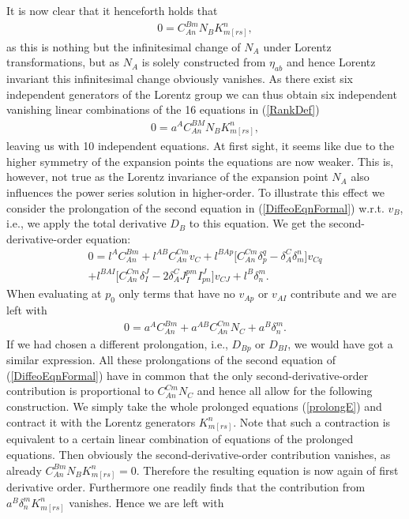 It is now clear that it henceforth holds that
\begin{align}
    0 = C^{Bm}_{An}N_B K_{m[rs]}^n,
\end{align}
as this is nothing but the infinitesimal change of $N_A$ under Lorentz transformations, but as $N_A$ is solely constructed from $\eta_{ab}$ and hence Lorentz invariant this infinitesimal change obviously vanishes. As there exist six independent generators of the Lorentz group we can thus obtain six independent vanishing linear combinations of the 16 equations in (\ref{RankDef})
\begin{align}
    0 = a^A C^{BM}_{An}N_B K_{m[rs]}^n,
\end{align}
leaving us with 10 independent equations. At first sight, it seems like due to the higher symmetry of the expansion points the equations are now weaker. This is, however, not true as the Lorentz invariance of the expansion point $N_A$ also influences the power series solution in higher-order. To illustrate this effect we consider the prolongation of the second equation in (\ref{DiffeoEqnFormal}) w.r.t. $v_B$, i.e., we apply the total derivative $D_B$ to this equation. We get the second-derivative-order equation:
\begin{multline}
    0 = l^AC_{An}^{Bm} + l^{AB}C_{An}^{Cm}v_C + l^{BAp} \bigl[ C_{An}^{Cm} \delta_p^q - \delta_A^C \delta_m^n \bigr] v_{Cq}\\
    + l^{BAI} \bigl[ C_{An}^{Cm} \delta_I^J - 2 \delta_A^C J_I^{pm} I^J_{pn}  \bigr] v_{CJ} + l^{B} \delta^m_n.
\end{multline}
When evaluating at $p_0$ only terms that have no $v_{Ap}$ or $v_{AI}$ contribute and we are left with 
\begin{align}\label{prolongE}
    0 = a^A C_{An}^{Bm} + a^{AB} C_{An}^{Cm} N_C +  a^B \delta^m_n.
\end{align}
If we had chosen a different prolongation, i.e., $D_{Bp}$ or $D_{BI}$, we would have got a similar expression. All these prolongations of the second equation of (\ref{DiffeoEqnFormal}) have in common that the only second-derivative-order contribution is proportional to $C^{Cm}_{An} N_C$ and hence all allow for the following construction. We simply take the whole prolonged equations (\ref{prolongE}) and contract it with the Lorentz generators $K_{m[rs]}^n$. Note that such a contraction is equivalent to a certain linear combination of equations of the prolonged equations. Then obviously the second-derivative-order contribution vanishes, as already $C_{An}^{Bm} N_B K_{m[rs]}^n = 0$.  Therefore the resulting equation is now again of first derivative order. Furthermore one readily finds that the contribution from $a^B \delta^m_n K_{m[rs]}^n$ vanishes. Hence we are left with 
